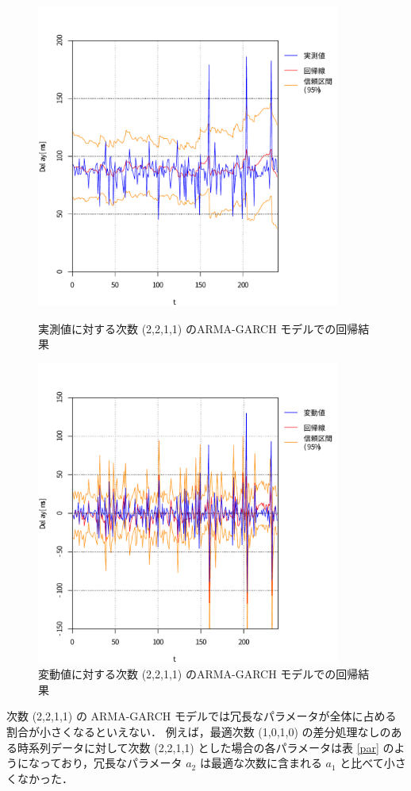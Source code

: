 \documentclass[a4j]{jarticle}
\begin{document}
\begin{figure}[tb]
\centering
\includegraphics[width=10cm]{../figure/0301_12-plot}
\caption{実測値に対する次数 (2,2,1,1) のARMA-GARCH モデルでの回帰結果}
\label{norm-reg}
\includegraphics[width=10cm]{../figure/0301_12-plot-diff}
\caption{変動値に対する次数 (2,2,1,1) のARMA-GARCH モデルでの回帰結果}
\label{diff-reg}
\end{figure}


次数 (2,2,1,1) の ARMA-GARCH モデルでは冗長なパラメータが全体に占める割合が小さくなるといえない．
例えば，最適次数 (1,0,1,0) の差分処理なしのある時系列データに対して次数 (2,2,1,1) とした場合の各パラメータは表 \ref{par} のようになっており，冗長なパラメータ $a_2$ は最適な次数に含まれる $a_1$ と比べて小さくなかった．
\end{document}
